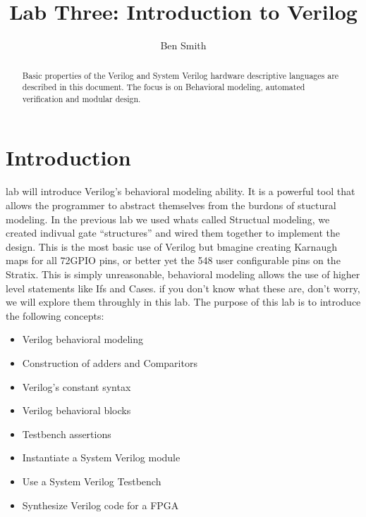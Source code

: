 
\title{Lab Three: Introduction to Verilog}
\author{Ben Smith}




  \maketitle
    \begin{abstract}
      Basic properties of the Verilog and System Verilog hardware descriptive languages are described in this document. The focus is on Behavioral modeling, automated verification and modular design.
    \end{abstract}
  \section{Introduction}
     lab will introduce Verilog's behavioral modeling ability. It is a powerful tool that allows the programmer to abstract themselves from the burdons of stuctural modeling. In the previous lab we used whats called Structual modeling, we created indivual gate ``structures'' and wired them together to implement the design. This is the most basic use of Verilog but bmagine creating Karnaugh maps for all 72GPIO pins, or better yet the 548 user configurable pins on the Stratix\cite{Altera:StratixDeviceOverview}. This is simply unreasonable, behavioral modeling allows the use of higher level statements like Ifs and Cases. if you don't know what these are, don't worry, we will explore them throughly in this lab. The purpose of this lab is to introduce the following concepts:
    \begin{itemize}
      \item Verilog behavioral modeling
      \item Construction of adders and Comparitors
      \item Verilog's constant syntax
      \item Verilog behavioral blocks
      \item Testbench assertions
      \item Instantiate a System Verilog module
      \item Use a System Verilog Testbench
      \item Synthesize Verilog code for a FPGA
    \end{itemize}
    

